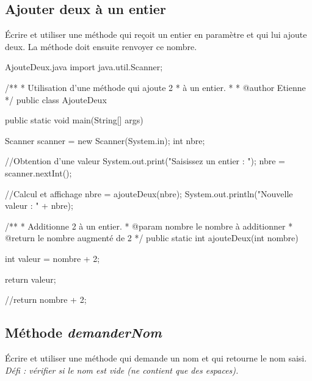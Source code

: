 \documentclass[12pt]{article}
\begin{document}
%
%
%
%
%

\subsection{Ajouter deux à un entier}

Écrire et utiliser une méthode qui reçoit un entier en paramètre et qui lui ajoute deux. La méthode doit ensuite renvoyer ce nombre.

\begin{MyTCB}{AjouteDeux.java}
import java.util.Scanner;

/**
 * Utilisation d'une méthode qui ajoute 2
 * à un entier.
 *
 * @author Etienne
 */
public class AjouteDeux {

	public static void main(String[] args) {
		
		Scanner scanner = new Scanner(System.in);
		int nbre;
		
		//Obtention d'une valeur
		System.out.print("Saisissez un entier : ");
		nbre = scanner.nextInt();
		
		//Calcul et affichage
		nbre = ajouteDeux(nbre);
		System.out.println("Nouvelle valeur : " + nbre);
		
	}
	
	
	/**
	 * Additionne 2 à un entier.
	 * @param nombre le nombre à additionner
	 * @return le nombre augmenté de 2
	 */
	public static int ajouteDeux(int nombre) {
		
		int valeur = nombre + 2;
		
		return valeur;
		
		//return nombre + 2;
	}
	
}
\end{MyTCB}

%
%
%
%
%
%

\subsection{Méthode \emph{demanderNom}}

Écrire et utiliser une méthode qui demande un nom et qui retourne le nom saisi.\\
\emph{Défi : vérifier si le nom est vide (ne contient que des espaces).}
\end{document}
